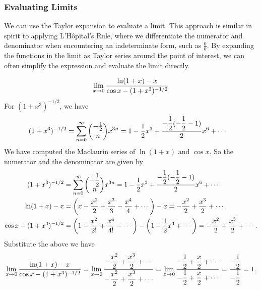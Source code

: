 \subsubsection{Evaluating Limits}  
We can use the Taylor expansion to evaluate a limit. This approach is similar in spirit to applying L'Hôpital's Rule, where we differentiate the numerator and denominator when encountering an indeterminate form, such as $\frac{0}{0}$. By expanding the functions in the limit as Taylor series around the point of interest, we can often simplify the expression and evaluate the limit directly.
\begin{ex}    
\[\displaystyle\lim_{x \to 0} \dfrac{\ln(1+x)- x}{\cos x - (1+x^3)^{-1/2}}\]
    For $(1+x^3)^{-1/2}$, we have
    \begin{align*}
    (1+x^3)^{-1/2} &= \displaystyle\sum_{n=0}^\infty {-\frac{1}{2} \choose n} x^{3n} = 1 - \dfrac{1}{2} x^3 + \dfrac{-\dfrac{1}{2}(-\dfrac{1}{2}-1)}{2} x^6 + \cdots 
    \end{align*}
    We have computed the Maclaurin series of $\ln(1+x)$ and $\cos x$. So the numerator and the denominator are given by
    \begin{align*}
    (1+x^3)^{-1/2} &= \displaystyle\sum_{n=0}^\infty {-\dfrac{1}{2} \choose n} x^{3n} = 1 - \dfrac{1}{2} x^3 + \dfrac{-\dfrac{1}{2}(-\dfrac{1}{2}-1)}{2} x^6 + \cdots \\
    \ln(1+x) - x &= \left( x - \dfrac{x^2}{2} + \dfrac{x^3}{3} - \dfrac{x^4}{4} + \cdots \right) - x = - \dfrac{x^2}{2} + \dfrac{x^3}{2} + \cdots \\
    \cos x - (1+x^3)^{-1/2} &= \left( 1 - \dfrac{x^2}{2!} + \dfrac{x^4}{4!} - \cdots \right) - \left( 1 - \dfrac{1}{2} x^3 + \cdots \right) = - \dfrac{x^2}{2} + \dfrac{x^3}{2} + \cdots.        
    \end{align*}
    Substitute the above we have
    \[\displaystyle\lim_{x \to 0} \dfrac{\ln(1+x) - x}{\cos x - (1+x^3)^{-1/2}} = \displaystyle\lim_{x \to 0} \dfrac{ - \dfrac{x^2}{2} + \dfrac{x^3}{2} + \cdots}{ - \dfrac{x^2}{2} + \dfrac{x^3}{2} + \cdots} = \displaystyle\lim_{x \to 0} \dfrac{ - \dfrac{1}{2} + \dfrac{x}{2} + \cdots}{ - \dfrac{1}{2} + \dfrac{x}{2} + \cdots} = \dfrac{ - \dfrac{1}{2}}{ - \dfrac{1}{2}} = 1.\]
\end{ex}
